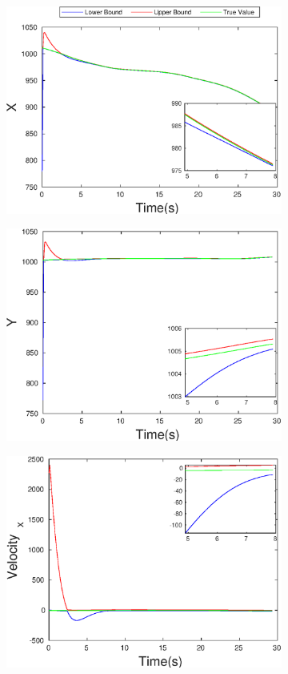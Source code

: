 \begin{figure}[h]
\begin{subfigure}{.5\linewidth}
\centering
\includegraphics[width=\linewidth]{figures/Prad/s3capradX}
\end{subfigure}
\begin{subfigure}{.5\linewidth}
\centering
\includegraphics[width=\linewidth]{figures/Prad/s3capradY}
\end{subfigure}
\begin{subfigure}{.5\linewidth}
\centering
\includegraphics[width=.9\linewidth]{figures/Prad/s3capradVelocity_x}

\end{subfigure}
\end{figure}
